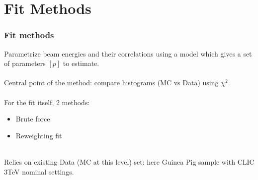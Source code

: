 \documentclass{beamer}
\begin{document}
\section{Fit Methods}
\begin{frame}
\frametitle{Fit methods}
Parametrize beam energies and their \alert{correlations} using a model which
gives a set of \alert{parameters $[p]$} to estimate. \\
~\\
Central point of the method: compare histograms (MC vs Data) using $\chi^2$. \\
~\\
For the fit itself, 2 methods:
\begin{itemize}
  \item Brute force
  \item Reweighting fit
\end{itemize}
~\\
Relies on existing \alert{Data} (MC at this level) set: here Guinea Pig sample
with CLIC 3TeV nominal settings.\\

\end{frame}
\end{document}
